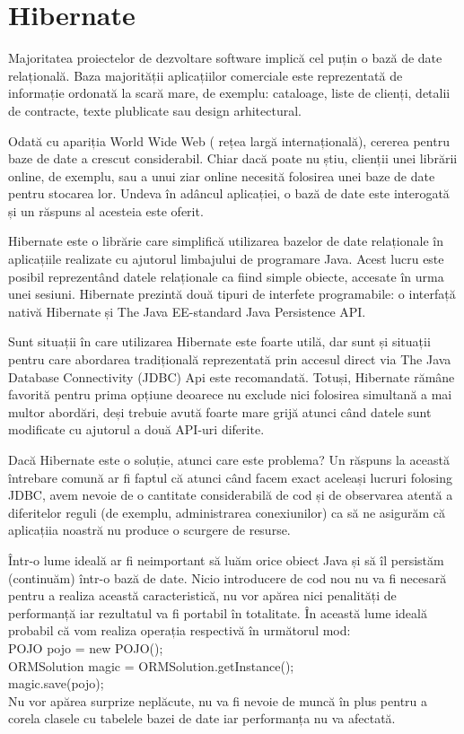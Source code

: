 \documentclass[12pt]{book}
\begin{document}
\section{Hibernate}
Majoritatea proiectelor de dezvoltare software implică cel puțin o bază de date relațională. Baza majorității aplicațiilor comerciale este reprezentată de informație ordonată la scară mare, de exemplu: cataloage, liste de clienți, detalii de contracte, texte plublicate sau design arhitectural.

Odată cu apariția World Wide Web ( rețea largă internațională), cererea pentru baze de date a crescut considerabil. Chiar dacă poate nu știu, clienții unei librării online, de exemplu, sau a unui ziar online necesită folosirea unei baze de date pentru stocarea lor. Undeva în adâncul aplicației, o bază de date este interogată și un răspuns al acesteia este oferit. 

Hibernate este o librărie care simplifică utilizarea bazelor de date relaționale în aplicațiile realizate cu ajutorul limbajului de programare Java. Acest lucru este posibil reprezentând datele relaționale ca fiind simple obiecte, accesate în urma unei sesiuni. Hibernate prezintă două tipuri de interfete programabile: o interfață nativă Hibernate și The Java EE-standard Java Persistence API. 

Sunt situații în care utilizarea Hibernate este foarte utilă, dar sunt și situații pentru care abordarea tradițională reprezentată prin accesul direct via The Java Database Connectivity (JDBC) Api este recomandată. Totuși, Hibernate rămâne favorită pentru prima opțiune deoarece nu exclude nici folosirea simultană a mai multor abordări, deși trebuie avută foarte mare grijă atunci când datele sunt modificate cu ajutorul a două API-uri diferite.

Dacă Hibernate este o soluție, atunci care este problema? Un răspuns la această întrebare comună ar fi faptul că atunci când facem exact aceleași lucruri folosing JDBC, avem nevoie de o cantitate considerabilă de cod și de observarea atentă a diferitelor reguli (de exemplu, administrarea conexiunilor) ca să ne asigurăm că aplicațiia noastră nu produce o scurgere de resurse. 

	

Într-o lume ideală ar fi neimportant să luăm orice obiect Java și să îl persistăm (continuăm) într-o bază de date. Nicio introducere de cod nou nu va fi necesară pentru a realiza această caracteristică, nu vor apărea nici penalități de performanță iar rezultatul va fi portabil în totalitate. În această lume ideală probabil că vom realiza operația respectivă în următorul mod:\\
POJO pojo = new POJO();\\
ORMSolution magic = ORMSolution.getInstance();\\
magic.save(pojo);\\
Nu vor apărea surprize neplăcute, nu va fi nevoie de muncă în plus pentru a corela clasele cu tabelele bazei de date iar performanța nu va afectată.
\end{document}
